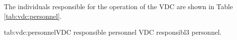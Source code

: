 \begin{safetyen}{0}{0}

The individuals responsible for the operation 
of the VDC are shown in Table \ref{tab:vdc:personnel}.

\begin{namestab}{tab:vdc:personnel}{VDC responsible personnel}{%
      VDC responsibl3 personnel.}
  \BogdanWojtsekhowski{}
\end{namestab}
\end{safetyen}


